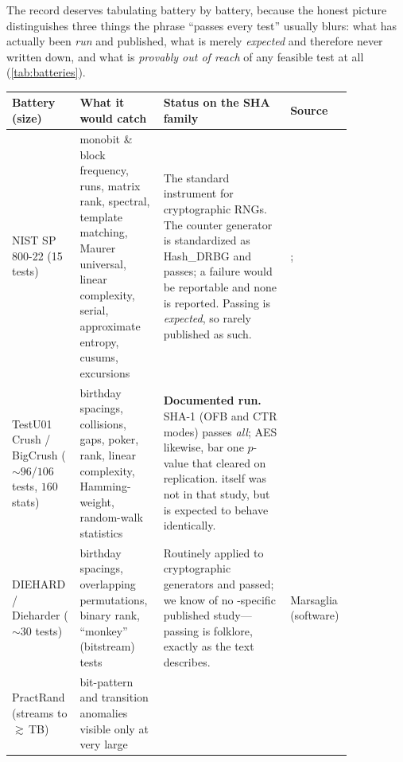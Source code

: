 The record deserves tabulating battery by battery, because the honest
picture distinguishes three things the phrase ``passes every test''
usually blurs: what has actually been \emph{run} and published, what is
merely \emph{expected} and therefore never written down, and what is
\emph{provably out of reach} of any feasible test at all
(\cref{tab:batteries}).

\begin{table}[H]
  \centering\small
  \renewcommand{\arraystretch}{1.25}
  \begin{tabular}{@{}p{0.15\linewidth} p{0.235\linewidth}
                     p{0.35\linewidth} p{0.115\linewidth}@{}}
    \toprule
    \textbf{Battery (size)} & \textbf{What it would catch} &
    \textbf{Status on the SHA family} & \textbf{Source} \\
    \midrule
    NIST SP\,800-22 \newline (15 tests) &
    monobit \& block frequency, runs, matrix rank, spectral, template
    matching, Maurer universal, linear complexity, serial, approximate
    entropy, cusums, excursions &
    The standard instrument for cryptographic RNGs. The \SHA{} counter
    generator is standardized as \textsf{Hash\_DRBG} and passes; a
    failure would be reportable and none is reported. Passing is
    \emph{expected}, so rarely published as such. &
    \citet{NIST2010}; \citet{SP80090A} \\
    TestU01 Crush / BigCrush \newline (${\sim}96$/$106$ tests, $160$ stats) &
    birthday spacings, collisions, gaps, poker, rank, linear complexity,
    Hamming-weight, random-walk statistics &
    \textbf{Documented run.} SHA-1 (OFB and CTR modes) passes
    \emph{all}; AES likewise, bar one $p$-value that cleared on
    replication. \SHA{} itself was not in that study, but is expected to
    behave identically. &
    \citet{LEcuyerSimard2007} \\
    DIEHARD / Dieharder \newline (${\sim}30$ tests) &
    birthday spacings, overlapping permutations, binary rank, ``monkey''
    (bitstream) tests &
    Routinely applied to cryptographic generators and passed; we know of
    no \SHA{}-specific published study---passing is folklore, exactly as
    the text describes. &
    Marsaglia \newline (software) \\
    PractRand \newline (streams to ${\gtrsim}$\,TB) &
    bit-pattern and transition anomalies visible only at very large

\end{tabular}
\end{table}
